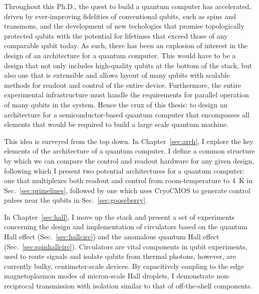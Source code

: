 %
%
%
Throughout this Ph.D., the quest to build a quantum computer has accelerated, driven by ever-improving
fidelities of conventional qubits, such as spins and transmons, and the development of new techologies
that promise topologically protected qubits with the potential for lifetimes that exceed those of any comparable
qubit today. As such, there has been an explosion of interest in the design of an architecture for a
quantum computer. This would have to be a design that not only includes high-quality qubits at the bottom of the stack,
but also one that is extensible and allows layout of many qubits with scalable methods for readout and
control of the entire device. Furthermore, the entire experimental infrastructure must handle the requirements for parallel operation
of many qubits in the system. Hence the crux of this thesis: to design an architecture for a semiconductor-based
quantum computer that encompasses all elements that would be required to build a large scale quantum machine.

This idea is surveyed from the top down. In Chapter~\ref{sec:arch}, I explore the key elements of the
architecture of a quantum computer. I define a common structure by which we can compare the control
and readout hardware for any given design, following which I present two potential architectures for
a quantum computer: one that multiplexes both readout and control from room-temperature to \SI{4}{\kelvin} in
Sec.~\ref{sec:primelines}, followed by one which uses {CryoCMOS} to generate control pulses near the qubits
in Sec.~\ref{sec:gooseberry}.

In Chapter~\ref{sec:hall}, I move up the stack and present a set of experiments concerning the design and
implementation of circulators based on the quantum Hall effect (Sec.~\ref{sec:hallcirc}) and the
anomalous quantum Hall effect (Sec.~\ref{sec:spinhallcirc}). Circulators are vital components in qubit
experiments, used to route signals and isolate qubits from thermal photons, however, are currently bulky,
centimeter-scale devices. By capacitively coupling to the edge magnetoplasmon modes of micron-scale Hall droplets,
I demonstrate non-reciprocal transmission with isolation similar to that of off-the-shelf components.


